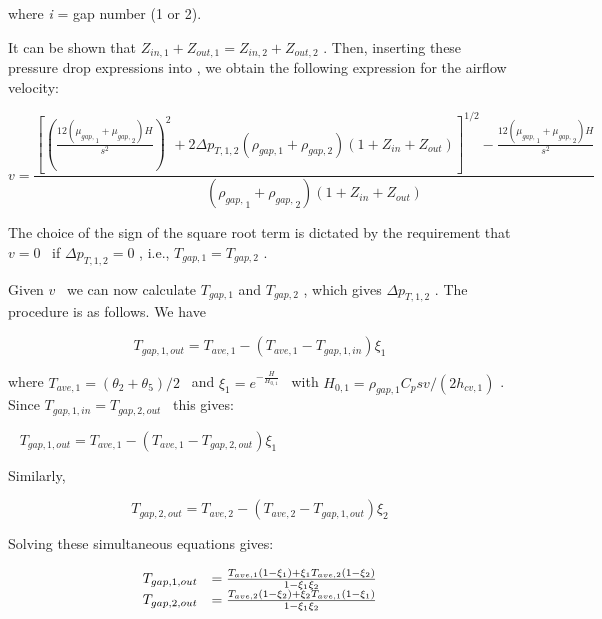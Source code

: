 where \emph{i} = gap number (1 or 2).

It can be shown that \({Z_{in,1}} + {Z_{out,1}} = {Z_{in,2}} + {Z_{out,2}}\) . Then, inserting these pressure drop expressions into , we obtain the following expression for the airflow velocity:

\begin{equation}
v = \frac{{{{\left[ {{{\left( {\frac{{12({\mu_{gap,}}_1 + {\mu_{gap,}}_2)H}}{{{s^2}}}} \right)}^2} + 2\Delta {p_{T,1,2}}({\rho_{gap,1}} + {\rho_{gap,2}})(1 + {Z_{in}} + {Z_{out}})} \right]}^{1/2}} - \frac{{12({\mu_{gap,}}_1 + {\mu_{gap,}}_2)H}}{{{s^2}}}}}{{({\rho_{gap,}}_1 + {\rho_{gap,}}_2)(1 + {Z_{in}} + {Z_{out}})}}
\end{equation}

The choice of the sign of the square root term is dictated by the requirement that \(v = 0\) ~if \(\Delta {p_{T,1,2}} = 0\) , i.e., \({T_{gap,1}} = {T_{gap,2}}\) .

Given \(v\) ~we can now calculate \({T_{gap,1}}\) and \({T_{gap,2}}\) , which gives \(\Delta {p_{T,1,2}}\) . The procedure is as follows. We have

\begin{equation}
{T_{gap,1,out}} = {T_{ave,1}} - ({T_{ave,1}} - {T_{gap,1,in}}){\xi_1}
\end{equation}

where \({T_{ave,1}} = ({\theta_2} + {\theta_5})/2\) ~and \({\xi_1} = {e^{ - \frac{H}{{{H_{0,1}}}}}}\) ~with \({H_{0,1}} = {\rho_{gap,1}}{C_p}sv/(2{h_{cv,1}})\) . Since \({T_{gap,1,in}} = {T_{gap,2,out}}\) ~this gives:

~ \({T_{gap,1,out}} = {T_{ave,1}} - ({T_{ave,1}} - {T_{gap,2,out}}){\xi_1}\)

Similarly,

\begin{equation}
{T_{gap,2,out}} = {T_{ave,2}} - ({T_{ave,2}} - {T_{gap,1,out}}){\xi_2}
\end{equation}

Solving these simultaneous equations gives:

\begin{equation}
  \begin{array}{rl}
    T_{gap,1,out} &= \frac{T_{ave,1}\PB{1 - \xi_1} + \xi_1 T_{ave,2}\PB{1 - \xi_2}}{1 - \xi_1 \xi_2} \\
    T_{gap,2,out} &= \frac{T_{ave,2}\PB{1 - \xi_2} + \xi_2 T_{ave,1}\PB{1 - \xi_1}}{1 - \xi_1 \xi_2}
  \end{array}
\end{equation}

